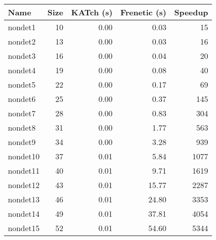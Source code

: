\begin{tabular}{lrrrr}
\toprule
Name & Size & KATch (s) & Frenetic (s) & Speedup \\
\midrule
nondet1 & 10 & 0.00 & 0.03 & 15 \\
nondet2 & 13 & 0.00 & 0.03 & 16 \\
nondet3 & 16 & 0.00 & 0.04 & 20 \\
nondet4 & 19 & 0.00 & 0.08 & 40 \\
nondet5 & 22 & 0.00 & 0.17 & 69 \\
nondet6 & 25 & 0.00 & 0.37 & 145 \\
nondet7 & 28 & 0.00 & 0.83 & 304 \\
nondet8 & 31 & 0.00 & 1.77 & 563 \\
nondet9 & 34 & 0.00 & 3.28 & 939 \\
nondet10 & 37 & 0.01 & 5.84 & 1077 \\
nondet11 & 40 & 0.01 & 9.71 & 1619 \\
nondet12 & 43 & 0.01 & 15.77 & 2287 \\
nondet13 & 46 & 0.01 & 24.80 & 3353 \\
nondet14 & 49 & 0.01 & 37.81 & 4054 \\
nondet15 & 52 & 0.01 & 54.60 & 5344 \\
\bottomrule
\end{tabular}
